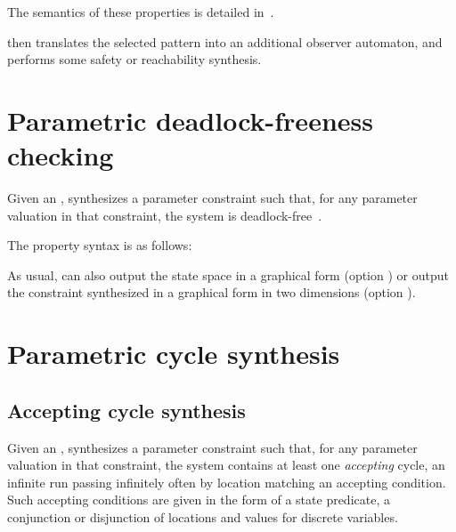The semantics of these properties is detailed in~\cite{Andre13ICECCS}.

%
%

\imitator{} then translates the selected pattern into an additional observer automaton, and performs some safety or reachability synthesis.


\section{Parametric deadlock-freeness checking}\label{ss:mode:PDFC}

Given an \NIPTA{}, \PDFC{} synthesizes a parameter constraint such that, for any parameter valuation in that constraint, the system is deadlock-free~\cite{Andre16}.

The property syntax is as follows:


As usual, \imitator{} can also
output the state space in a graphical form (option )
or
output the constraint synthesized in a graphical form in two dimensions (option ).


\section{Parametric cycle synthesis}\label{ss:mode:LoopSynth}


\subsection{Accepting cycle synthesis}\label{ss:accepting-loop}
Given an \NIPTA{}, \imitator{} synthesizes a parameter constraint such that, for any parameter valuation in that constraint, the system contains at least one \emph{accepting} cycle, \ie{} an infinite run passing infinitely often by location matching an accepting condition.
Such accepting conditions are given in the form of a state predicate, \ie{} a conjunction or disjunction of locations and values for discrete variables.

